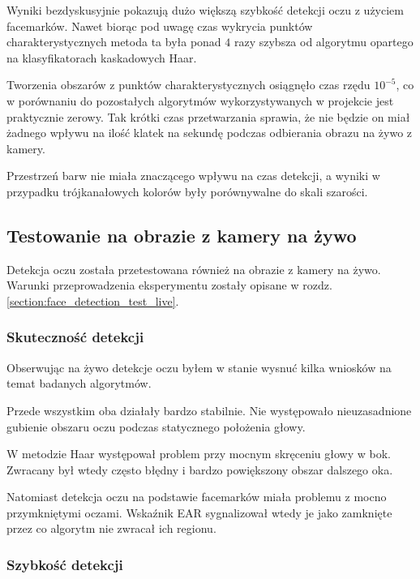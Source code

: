 

Wyniki bezdyskusyjnie pokazują dużo większą szybkość detekcji oczu z użyciem facemarków. Nawet biorąc pod uwagę czas wykrycia punktów charakterystycznych metoda ta była ponad $4$ razy szybsza od algorytmu opartego na klasyfikatorach kaskadowych Haar. 
\par
Tworzenia obszarów z punktów charakterystycznych osiągnęło czas rzędu $10^{-5}$, co w porównaniu do pozostałych algorytmów wykorzystywanych w projekcie jest praktycznie zerowy. Tak krótki czas przetwarzania sprawia, że nie będzie on miał żadnego wpływu na ilość klatek na sekundę podczas odbierania obrazu na żywo z kamery.
\par
Przestrzeń barw nie miała znaczącego wpływu na czas detekcji, a wyniki w przypadku trójkanałowych kolorów były porównywalne do skali szarości.

\subsection{Testowanie na obrazie z kamery na żywo}

Detekcja oczu została przetestowana również na obrazie z kamery na żywo. Warunki przeprowadzenia eksperymentu zostały opisane w rozdz. \hyperref[{section:face_detection_test_live}]{\ref{section:face_detection_test_live}}.

\subsubsection{Skuteczność detekcji}

Obserwując na żywo detekcje oczu byłem w stanie wysnuć kilka wniosków na temat badanych algorytmów.

\vspace{4mm}

Przede wszystkim oba działały bardzo stabilnie. Nie występowało nieuzasadnione gubienie obszaru oczu podczas statycznego położenia głowy. 
\par
W metodzie Haar występował problem przy mocnym skręceniu głowy w bok. Zwracany był wtedy często błędny i bardzo powiększony obszar dalszego oka. 
\par
Natomiast detekcja oczu na podstawie facemarków miała problemu z mocno przymkniętymi oczami. Wskaźnik EAR sygnalizował wtedy je jako zamknięte przez co algorytm nie zwracał ich regionu.

\subsubsection{Szybkość detekcji}


